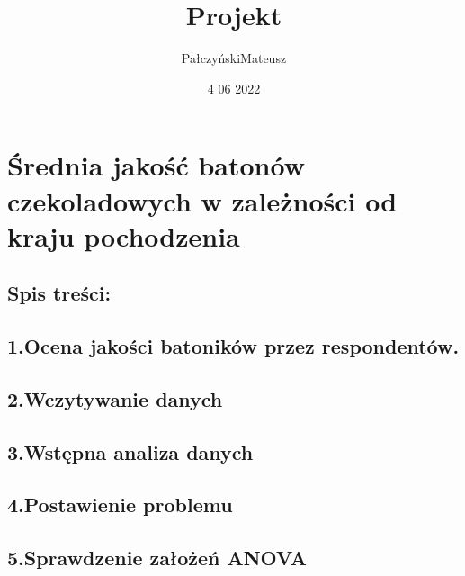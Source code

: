 \documentclass[
]{article}
\title{Projekt}
\author{PałczyńskiMateusz}
\date{4 06 2022}
\begin{document}
\maketitle

\hypertarget{ux15brednia-jakoux15bux107-batonuxf3w-czekoladowych-w-zaleux17cnoux15bci-od-kraju-pochodzenia}{%
\section{Średnia jakość batonów czekoladowych w zależności od kraju
pochodzenia}\label{ux15brednia-jakoux15bux107-batonuxf3w-czekoladowych-w-zaleux17cnoux15bci-od-kraju-pochodzenia}}

\hypertarget{spis-treux15bci}{%
\subsection{Spis treści:}\label{spis-treux15bci}}

\hypertarget{ocena-jakoux15bci-batonikuxf3w-przez-respondentuxf3w.}{%
\subsection{1.Ocena jakości batoników przez
respondentów.}\label{ocena-jakoux15bci-batonikuxf3w-przez-respondentuxf3w.}}

\hypertarget{wczytywanie-danych}{%
\subsection{2.Wczytywanie danych}\label{wczytywanie-danych}}

\hypertarget{wstux119pna-analiza-danych}{%
\subsection{3.Wstępna analiza danych}\label{wstux119pna-analiza-danych}}

\hypertarget{postawienie-problemu}{%
\subsection{4.Postawienie problemu}\label{postawienie-problemu}}

\hypertarget{sprawdzenie-zaux142oux17ceux144-anova}{%
\subsection{5.Sprawdzenie założeń
ANOVA}\label{sprawdzenie-zaux142oux17ceux144-anova}}
\end{document}
